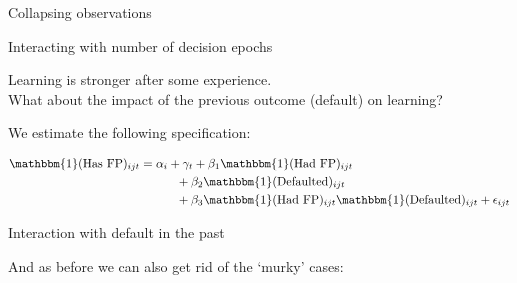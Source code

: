 \documentclass[oneside,11pt]{article}
\begin{document}
\begin{table}[H]
\caption{Collapsing observations}
\begin{center}
\scriptsize{}
\end{center}
 \scriptsize

\end{table}



\begin{table}[H]
\caption{Interacting with number of decision epochs}
\begin{center}
\scriptsize{}
\end{center}
 \scriptsize

\end{table}
Learning is stronger after some experience.\\

What about the impact of the previous outcome (default) on learning?

We estimate the following specification:



\begin{align*}
    \mathbbm{1}(\text{Has FP})_{ijt} &= \alpha_i + \gamma_t + \beta_1\mathbbm{1}(\text{Had FP})_{ijt} \\
    & \qquad \quad + \beta_2\mathbbm{1}(\text{Defaulted})_{ijt} \\
    & \qquad \quad  + \beta_3\mathbbm{1}(\text{Had FP})_{ijt}\mathbbm{1}(\text{Defaulted})_{ijt}   + \epsilon_{ijt}
\end{align*}




\begin{table}[H]
\caption{Interaction with default in the past}
\begin{center}
\scriptsize{}
\end{center}
 \scriptsize

\end{table}



And as before we can also get rid of the `murky' cases:


\end{document}
